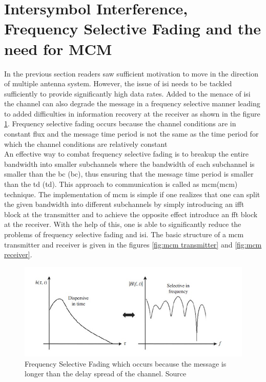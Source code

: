 \section{Intersymbol Interference, Frequency Selective Fading and the need for MCM}
In the previous section readers saw sufficient motivation to move in the direction of multiple antenna system. However, the issue of \acrshort{isi} needs to be tackled sufficiently to provide significantly high data  rates. Added to the menace of \acrshort{isi} the channel can also degrade the message in a frequency selective manner leading to added difficulties in information recovery at the receiver as shown in the figure \ref{fig:frequency selective fading}. Frequency selective fading occurs because the channel conditions are in constant flux and the message time period is not the same as the time period for which the channel conditions are relatively constant\\
An effective way to combat frequency selective fading is to breakup the entire bandwidth into smaller subchannels where the bandwidth of each subchannel is smaller than the \acrlong{bc} (\acrshort{bc}), thus ensuring that the message time period is smaller than the \acrlong{td} (\acrshort{td}). This approach to communication is called as \acrlong{mcm}(\acrshort{mcm}) technique. The implementation of \acrshort{mcm} is simple if one realizes that one can split the given bandwidth into different subchannels by simply introducing an \acrshort{ifft} block at the transmitter and to achieve the opposite effect introduce an \acrshort{fft} block at the receiver. With the help of this, one is able to significantly reduce the problems of frequency selective fading and \acrshort{isi}. The basic structure of a \acrshort{mcm} transmitter and receiver is given in the figures \ref{fig:mcm transmitter} and \ref{fig:mcm receiver}.

\begin{figure}[!htbp]
\centering
\includegraphics[scale=1]{Chapter 2/Figures/Frequency Selective Fading}
\caption[Frequency Selective Fading]{Frequency Selective Fading which occurs because the message is longer than the delay spread of the channel. Source \textcite{Ghosh2010}}
\label{fig:frequency selective fading}
\end{figure}

